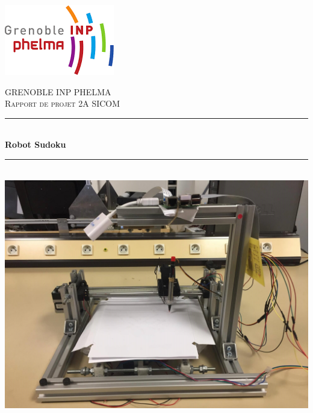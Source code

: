 \documentclass[12pt]{article}
\author{Mohamed SANA}
\title{}
\newcommand{\HRule}{\rule{\linewidth}{0.5mm}}
\begin{document}
\begin{titlepage}
  \begin{sffamily}
  \begin{center}

     \begin{flushright}
    \includegraphics[scale=0.5]{logo_phelma.png}~\\[1.5cm]
      \end{flushright}
      
    \textsc{\LARGE GRENOBLE INP PHELMA}\\[2cm]

    \textsc{\Large Rapport de projet 2A SICOM}\\[1.5cm]

    \HRule \\[0.4cm]
    { \huge \bfseries Robot Sudoku\\[0.2cm] }

    \HRule \\[2cm]
    \includegraphics[scale=0.2]{pp.jpg}
    \\[2cm]


\end{center}
\end{sffamily}
\end{titlepage}
\end{document}
